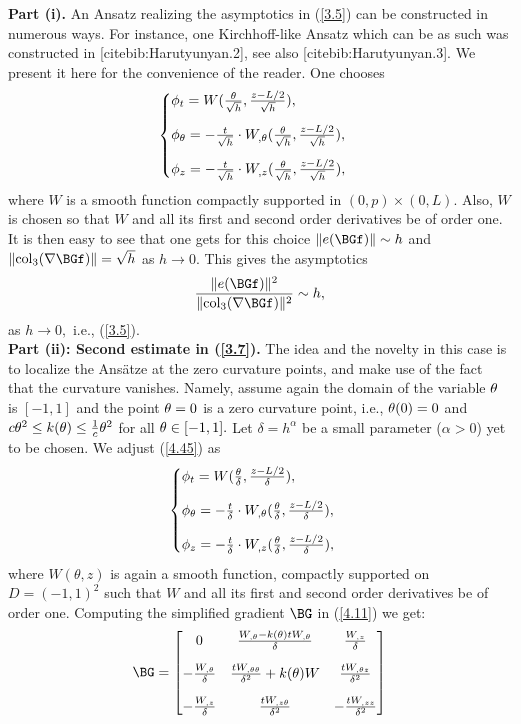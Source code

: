 \noindent \textbf{Part (i).} An Ansatz realizing the asymptotics in (\ref{3.5}) can be constructed in numerous ways. For instance, one Kirchhoff-like Ansatz which can be as such was constructed in [cite{bib:Harutyunyan.2}], see also [cite{bib:Harutyunyan.3}]. We present it here for the convenience of the reader. One chooses 
\begin{equation}
\label{4.45}
\begin{cases}
\phi_t=W(\frac{\theta}{\sqrt{h}},\frac{z-L/2}{\sqrt{h}}),\\[10pt]
\phi_\theta=-\frac{t}{\sqrt{h}} \cdot W_{,\theta}(\frac{\theta}{\sqrt{h}},\frac{z-L/2}{\sqrt{h}}),\\[10pt]
\phi_z=-\frac{t}{\sqrt{h}} \cdot W_{,z}(\frac{\theta}{\sqrt{h}},\frac{z-L/2}{\sqrt{h}}),
\end{cases}
\end{equation}
where $W$ is a smooth function compactly supported in $(0,p)\times (0,L).$ Also, $W$ is chosen so that $W$ and all its first and second order derivatives be of order one. It is then easy to see that one gets for this choice $\|e(\BGf)\|\sim h$ and $\|\mathrm{col}_3(\nabla\BGf)\|=\sqrt{h}$ as $h\to 0.$ This gives the asymptotics 
$$\frac{\|e(\BGf)\|^2}{\|\mathrm{col}_3(\nabla\BGf)\|^2}\sim h,$$
as $h\to 0,$ i.e., (\ref{3.5}).\\
\noindent \textbf{Part (ii): Second estimate in (\ref{3.7}).} The idea and the novelty in this case is to localize the Ans\"atze at the zero curvature points, and make use of the fact that the curvature vanishes. Namely, assume again the domain of the variable $\theta$ is $[-1,1]$ and the point $\theta=0$ is a zero curvature point, i.e., 
$\theta(0)=0$ and $c\theta^2\leq k(\theta)\leq \frac{1}{c}\theta^2$ for all $\theta\in [-1,1].$ Let $\delta=h^\alpha$ be a small parameter ($\alpha>0$) yet to be chosen. We adjust (\ref{4.45}) as 
\begin{equation}
\label{4.46}
\begin{cases}
\phi_t=W(\frac{\theta}{\delta},\frac{z-L/2}{\delta}),\\[10pt]
\phi_\theta=-\frac{t}{\delta} \cdot W_{,\theta}(\frac{\theta}{\delta},\frac{z-L/2}{\delta}),\\[10pt]
\phi_z=-\frac{t}{\delta}\cdot W_{,z}(\frac{\theta}{\delta},\frac{z-L/2}{\delta}),
\end{cases}
\end{equation}
where $W(\theta,z)$ is again a smooth function, compactly supported on $D=(-1,1)^2$ such that $W$ and all its first and second order derivatives be of order one. 
Computing the simplified gradient $\BG$ in (\ref{4.11}) we get:
\begin{align*}
\BG=\begin{bmatrix} 
0     &     \frac{W_{,\theta}-k(\theta)tW_{,\theta}}{\delta }    &     \frac{W_{,z}}{\delta} \\[10pt]
-\frac{W_{,\theta}}{\delta}    &    \frac{tW_{,\theta\theta}}{\delta^2}+k(\theta)W      &      \frac{tW_{,\theta z}}{\delta^2}\\[10pt]
-\frac{W_{,z}}{\delta}    &     \frac{tW_{,z\theta}}{\delta^2}   &     -\frac{tW_{,zz}}{\delta^2}
\end{bmatrix}	
\end{align*}

